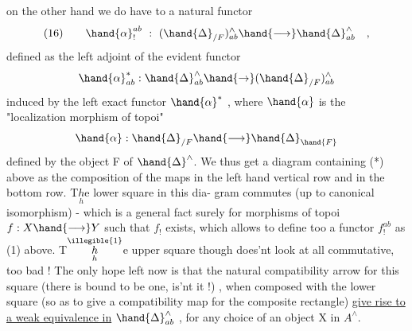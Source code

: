 
on the other hand we do have to a natural functor
\[(16)\qquad \hand{\alpha}^{ab}_{!} \ : \ (\hand{\Delta}_{/F})^{\wedge}_{ab} \hand{\longrightarrow} \hand{\Delta}^{\wedge}_{ab} \quad ,\]
defined as the left adjoint of the evident functor
\[\hand{\alpha}^{*}_{ab} : \hand{\Delta}^{\wedge}_{ab} \hand{\to} (\hand{\Delta}_{/F})^{\wedge}_{ab}\]
induced by the left exact functor $\hand{\alpha}^{*}$ , where $\hand{\alpha}$ is the 
"localization morphism of topoi"
\[\hand{\alpha} : \hand{\Delta}_{/F} \hand{\longrightarrow} \hand{\Delta}_{\hand{F}}\]
defined by the object F of $\hand{\Delta}^{\wedge}$. We thus get a diagram
containing (*) above as the composition of the maps in the left hand
vertical row and  in the bottom row. T$\underset{h}{h}$e lower square in this dia-%
gram commutes (up to canonical isomorphism) - which is a general fact
surely for morphisms of topoi $f : X \hand{\longrightarrow} Y$ such that $f_{!}$ exists, which
allows to define too a functor $f^{ab}_{!}$ as (1) above. T$\overset{\illegible{1}}{\underset{h}{h}}$e upper
square though does'nt look at all commutative, too bad ! The only
hope left now is that the natural compatibility arrow for this square
(there is bound to be one, is'nt it !) , when composed with the lower
square (so as to give a compatibility map for the composite rectangle)
\uline{ give rise to a weak equivalence in} $\hand{\Delta}^{\wedge}_{ab}$ , for any choice of
an object X in $A^{\wedge}$.

